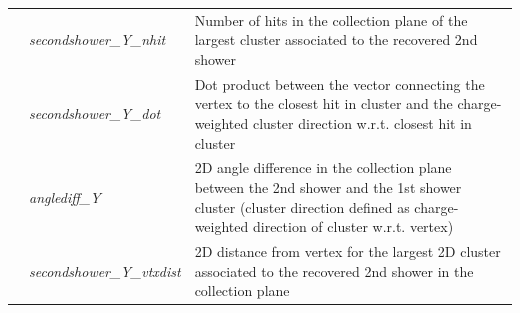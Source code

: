 \begin{table}[ht]
\begin{tabular}{ m{} | m{} | m{}  }
\hline
\multicolumn{1}{l|}{} & \emph{secondshower\_Y\_nhit} & Number of hits in the collection plane of the largest cluster associated to the  recovered 2nd shower  \\  \cline{2-3}
\parbox[t]{2mm}{}  & \emph{secondshower\_Y\_dot} &  Dot product between the vector connecting the vertex to the closest hit in cluster and the charge-weighted cluster direction w.r.t. closest hit in cluster \\  
 & \emph{anglediff\_Y} & 2D angle difference in the collection plane between the 2nd shower and the 1st shower cluster  (cluster direction defined as charge-weighted direction of cluster w.r.t. vertex) \\ 
 & \emph{secondshower\_Y\_vtxdist} & 2D distance from vertex for the largest 2D cluster associated to the  recovered 2nd shower in the collection plane \\
\hline
\end{tabular}
\label{tab:variableSummary}
\end{table}
